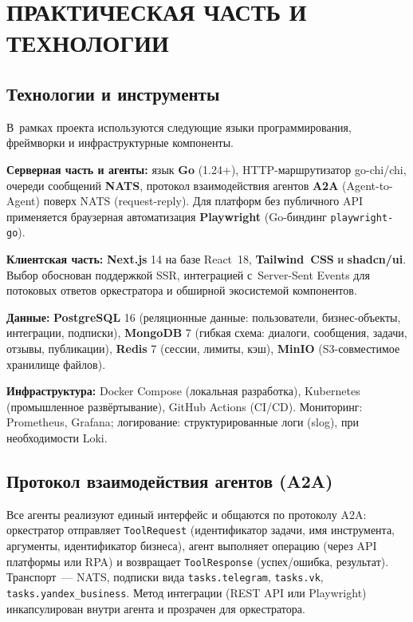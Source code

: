 \chapter{{\fontsize{14pt}{21pt}\selectfont\MakeUppercase{Практическая часть и технологии}}}
\label{ch:technologies}

\section{Технологии и инструменты}

В~рамках проекта используются следующие языки программирования, фреймворки и инфраструктурные компоненты.

\textbf{Серверная часть и агенты:} язык \textbf{Go} (1.24+), HTTP-маршрутизатор go-chi/chi, очереди сообщений \textbf{NATS}, протокол взаимодействия агентов \textbf{A2A} (Agent-to-Agent) поверх NATS (request-reply). Для платформ без публичного API применяется браузерная автоматизация \textbf{Playwright} (Go-биндинг \texttt{playwright-go}).

\textbf{Клиентская часть:} \textbf{Next.js} 14 на базе React~18, \textbf{Tailwind~CSS} и \textbf{shadcn/ui}. Выбор обоснован поддержкой SSR, интеграцией с~Server-Sent Events для потоковых ответов оркестратора и обширной экосистемой компонентов.

\textbf{Данные:} \textbf{PostgreSQL} 16 (реляционные данные: пользователи, бизнес-объекты, интеграции, подписки), \textbf{MongoDB} 7 (гибкая схема: диалоги, сообщения, задачи, отзывы, публикации), \textbf{Redis} 7 (сессии, лимиты, кэш), \textbf{MinIO} (S3-совместимое хранилище файлов).

\textbf{Инфраструктура:} Docker Compose (локальная разработка), Kubernetes (промышленное развёртывание), GitHub Actions (CI/CD). Мониторинг: Prometheus, Grafana; логирование: структурированные логи (slog), при необходимости Loki.

\section{Протокол взаимодействия агентов (A2A)}

Все агенты реализуют единый интерфейс и общаются по протоколу A2A: оркестратор отправляет \texttt{ToolRequest} (идентификатор задачи, имя инструмента, аргументы, идентификатор бизнеса), агент выполняет операцию (через API платформы или RPA) и возвращает \texttt{ToolResponse} (успех/ошибка, результат). Транспорт~--- NATS, подписки вида \texttt{tasks.telegram}, \texttt{tasks.vk}, \texttt{tasks.yandex\_business}. Метод интеграции (REST API или Playwright) инкапсулирован внутри агента и прозрачен для оркестратора.

